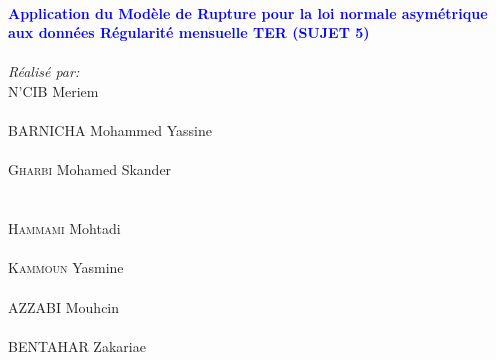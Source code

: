 \begin{titlepage}
\vskip0.2cm








\vskip 0.2cm%

\HRule \\[0.3cm]
\textcolor{blue}{ \large \bfseries Application du Modèle de Rupture pour la loi normale asymétrique aux données Régularité mensuelle TER (SUJET 5)}\\[0.3cm] %

\HRule \\[0.6cm]
\vskip0.2cm%
\textit{Réalisé par:}\\[0.25cm]

     \textsc{N'CIB} Meriem
      \\    \vspace*{0.75cm}\\
      \textsc{BARNICHA} Mohammed Yassine
      \\    \vspace*{0.5cm}\\
        \textsc{Gharbi} Mohamed Skander \\
         \\    \vspace*{0.5cm}\\  
     \textsc{Hammami} Mohtadi
      \\    \vspace*{0.5cm}\\
     \textsc{Kammoun} Yasmine
      \\    \vspace*{0.5cm}\\
     \textsc{AZZABI} Mouhcin
      \\    \vspace*{0.5cm}\\
     \textsc{BENTAHAR} Zakariae
      \\    \vspace*{0.5cm}\\


\end{titlepage}
